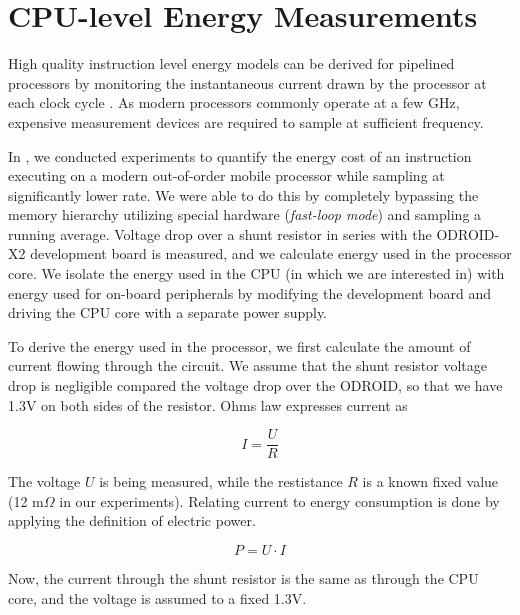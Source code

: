 \section{CPU-level Energy Measurements}

High quality instruction level energy models can be derived for pipelined
processors by monitoring the instantaneous current drawn by the processor at
each clock cycle \cite{nikolaidis2005instruction}. As modern processors commonly
operate at a few GHz, expensive measurement devices are required to sample
at sufficient frequency.

In \cite{rundehvatum2013exploring}, we conducted experiments to quantify the
energy cost of an instruction executing on a modern out-of-order mobile
processor while sampling at significantly lower rate. We were able to do this by
completely bypassing the memory hierarchy utilizing special hardware
(\emph{fast-loop mode}) and sampling a running average. Voltage drop over a
shunt resistor in series with the ODROID-X2 development board is measured, and
we calculate energy used in the processor core. We isolate the energy used in
the CPU (in which we are interested in) with energy used for on-board
peripherals by modifying the development board and driving the CPU core with a
separate power supply.

To derive the energy used in the processor, we first calculate the amount of
current flowing through the circuit. We assume that the shunt resistor voltage
drop is negligible compared the voltage drop over the ODROID, so that we have
1.3V on both sides of the resistor. Ohms law expresses current as

\begin{equation}
    I=\frac{U}{R}
    \label{eq:ohm}
\end{equation}

The voltage $U$ is being measured, while the restistance $R$ is a known fixed
value (12 m$\Omega$ in our experiments). Relating current to energy consumption
is done by applying the definition of electric power.

\begin{equation}
    P=U \cdot I
    \label{eq:power}
\end{equation}

Now, the current through the shunt resistor is the same as through the CPU core,
and the voltage is assumed to a fixed 1.3V.


